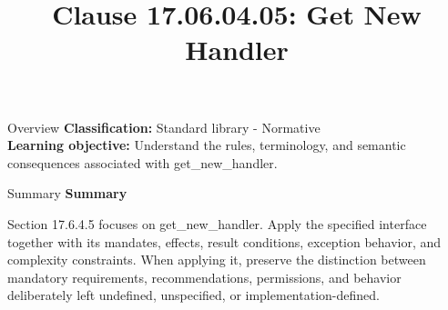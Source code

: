 \documentclass[10pt,letterpaper]{article}
\title{Clause 17.06.04.05: Get New Handler}
\author{}
\date{}
\begin{document}
\maketitle
\begin{CornellOverviewBox}{Overview}
\textbf{Classification:} Standard library - Normative\\[2pt]
\textbf{Learning objective:} Understand the rules, terminology, and semantic consequences associated with get\_new\_handler.
\end{CornellOverviewBox}\begin{CornellSummaryBox}{Summary}
{\sffamily\bfseries\color{Accent} Summary}\par\vspace{3pt}Section 17.6.4.5 focuses on get\_new\_handler. Apply the specified interface together with its mandates, effects, result conditions, exception behavior, and complexity constraints. When applying it, preserve the distinction between mandatory requirements, recommendations, permissions, and behavior deliberately left undefined, unspecified, or implementation-defined.
\end{CornellSummaryBox}
\end{document}
